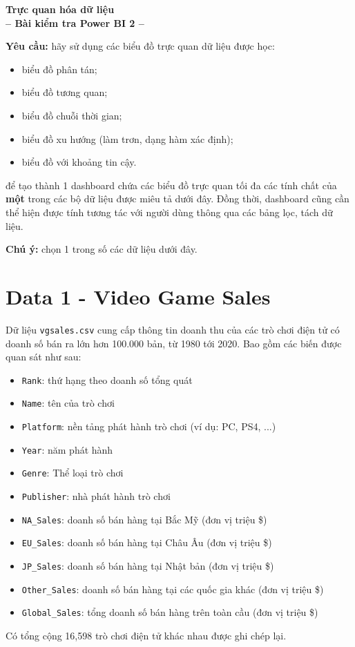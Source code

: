 \documentclass[12pt]{article}
\theoremstyle{definition} \newtheorem{exercise}[theorem]{\bf Bài tập}
\begin{document}
	
\begin{center}
	\textbf{\Large Trực quan hóa dữ liệu} \\
	\vspace{0.5cm}
	\textbf{-- Bài kiểm tra Power BI 2 --}
\end{center}

\vspace{0.5cm}

\noindent
\textbf{Yêu cầu:} hãy sử dụng các biểu đồ trực quan dữ liệu được học:
\begin{itemize}
\item biểu đồ phân tán;
\item biểu đồ tương quan;
\item biểu đồ chuỗi thời gian;
\item biểu đồ xu hướng (làm trơn, dạng hàm xác định);
\item biểu đồ với khoảng tin cậy.
\end{itemize}
để tạo thành 1 dashboard chứa các biểu đồ trực quan tối đa các tính chất của \textbf{một} trong các bộ dữ liệu được miêu tả dưới đây. Đồng thời, dashboard cũng cần thể hiện được tính tương tác với người dùng thông qua các bảng lọc, tách dữ liệu.

\noindent
\textbf{Chú ý:} chọn 1 trong số các dữ liệu dưới đây.

\section*{Data 1 - Video Game Sales}
Dữ liệu \texttt{vgsales.csv} cung cấp thông tin doanh thu của các trò chơi điện tử có doanh số bán ra lớn hơn 100.000 bản, từ 1980 tới 2020. Bao gồm các biến được quan sát như sau:
\begin{itemize}
\item \texttt{Rank}: thứ hạng theo doanh số tổng quát
\item \texttt{Name}: tên của trò chơi
\item \texttt{Platform}: nền tảng phát hành trò chơi (ví dụ: PC, PS4, ...)
\item \texttt{Year}: năm phát hành
\item \texttt{Genre}: Thể loại trò chơi
\item \texttt{Publisher}: nhà phát hành trò chơi
\item \texttt{NA\_Sales}: doanh số bán hàng tại Bắc Mỹ (đơn vị triệu \$)
\item \texttt{EU\_Sales}: doanh số bán hàng tại Châu Âu (đơn vị triệu \$)
\item \texttt{JP\_Sales}: doanh số bán hàng tại Nhật bản (đơn vị triệu \$)
\item \texttt{Other\_Sales}: doanh số bán hàng tại các quốc gia khác (đơn vị triệu \$)
\item \texttt{Global\_Sales}: tổng doanh số bán hàng trên toàn cầu (đơn vị triệu \$)
\end{itemize}
Có tổng cộng 16,598 trò chơi điện tử khác nhau được ghi chép lại.
\end{document}
